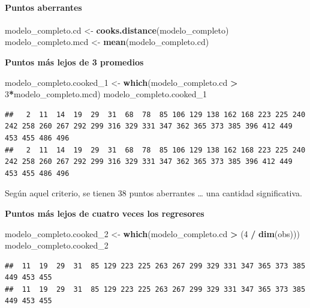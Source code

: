 \documentclass[
]{article}
\newenvironment{Shaded}{\begin{snugshade}}{\end{snugshade}}
\newcommand{\DecValTok}[1]{\textcolor[rgb]{0.00,0.00,0.81}{#1}}
\newcommand{\FunctionTok}[1]{\textcolor[rgb]{0.13,0.29,0.53}{\textbf{#1}}}
\newcommand{\NormalTok}[1]{#1}
\newcommand{\OtherTok}[1]{\textcolor[rgb]{0.56,0.35,0.01}{#1}}
\newcommand{\SpecialCharTok}[1]{\textcolor[rgb]{0.81,0.36,0.00}{\textbf{#1}}}
\begin{document}
\paragraph{Puntos aberrantes}\label{puntos-aberrantes}

\begin{Shaded}
\begin{Highlighting}[]
\NormalTok{modelo\_completo.cd }\OtherTok{\textless{}{-}} \FunctionTok{cooks.distance}\NormalTok{(modelo\_completo)}
\NormalTok{modelo\_completo.mcd }\OtherTok{\textless{}{-}} \FunctionTok{mean}\NormalTok{(modelo\_completo.cd)}
\end{Highlighting}
\end{Shaded}

\textbf{Puntos más lejos de 3 promedios}

\begin{Shaded}
\begin{Highlighting}[]
\NormalTok{modelo\_completo.cooked\_1 }\OtherTok{\textless{}{-}} \FunctionTok{which}\NormalTok{(modelo\_completo.cd }\SpecialCharTok{\textgreater{}} \DecValTok{3}\SpecialCharTok{*}\NormalTok{modelo\_completo.mcd)}
\NormalTok{modelo\_completo.cooked\_1}
\end{Highlighting}
\end{Shaded}

\begin{verbatim}
##   2  11  14  19  29  31  68  78  85 106 129 138 162 168 223 225 240 242 258 260 267 292 299 316 329 331 347 362 365 373 385 396 412 449 453 455 486 496 
##   2  11  14  19  29  31  68  78  85 106 129 138 162 168 223 225 240 242 258 260 267 292 299 316 329 331 347 362 365 373 385 396 412 449 453 455 486 496
\end{verbatim}

Según aquel criterio, se tienen 38 puntos aberrantes \ldots{} una
cantidad significativa.

\textbf{Puntos más lejos de cuatro veces los regresores}

\begin{Shaded}
\begin{Highlighting}[]
\NormalTok{modelo\_completo.cooked\_2 }\OtherTok{\textless{}{-}} \FunctionTok{which}\NormalTok{(modelo\_completo.cd }\SpecialCharTok{\textgreater{}}\NormalTok{ (}\DecValTok{4} \SpecialCharTok{/} \FunctionTok{dim}\NormalTok{(obs)))}
\NormalTok{modelo\_completo.cooked\_2}
\end{Highlighting}
\end{Shaded}

\begin{verbatim}
##  11  19  29  31  85 129 223 225 263 267 299 329 331 347 365 373 385 449 453 455 
##  11  19  29  31  85 129 223 225 263 267 299 329 331 347 365 373 385 449 453 455
\end{verbatim}
\end{document}
